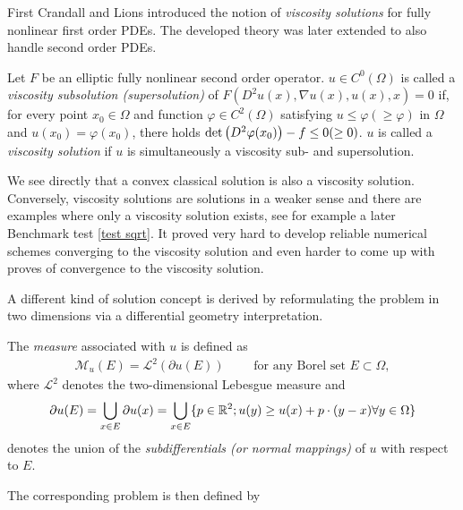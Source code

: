 First Crandall and Lions \cite{CL1983} introduced the notion of \emph{viscosity solutions} for fully nonlinear first order PDEs. The developed theory was later extended to also handle second order PDEs.
\begin{definition}
	Let $F$ be an elliptic  fully nonlinear second order operator.
	$u \in C^0(\Omega)$ is called a \emph{viscosity subsolution (supersolution)} of $F(D^2u(x), \nabla u(x), u(x), x)=0$  if, for every point $x_0 \in \Omega$ and function $\varphi \in C^2(\Omega)$ satisfying $u \leq \varphi (\geq \varphi)$ in $\Omega$ and $u(x_0) = \varphi(x_0)$, there holds $\det{\left(D^2 \varphi(x_0)\right)} - f \leq 0 (\geq 0)$. 
	$u$ is called a \emph{viscosity solution} if $u$ is simultaneously a viscosity sub- and supersolution.
\end{definition}

We see directly that a convex classical solution is also a viscosity solution. Conversely, viscosity solutions are solutions in a weaker sense and there are examples where only a viscosity solution exists, see for example a later Benchmark test \ref{test sqrt}.
It proved very hard to develop reliable numerical schemes converging to the viscosity solution and even harder to come up with proves of convergence to the viscosity solution.

A different kind of solution concept is derived by reformulating the \MA problem in two dimensions via a differential geometry interpretation.

\begin{definition}\label{def:MA measure}
	The \emph{\MA measure} associated with $u$ is defined as 
	\begin{align}
		\mathcal{M}_u (E) = \mathcal{L}^2(\partial u(E)) \qquad \text{ for any Borel set } E \subset \Omega,
	\end{align}
	where $\mathcal{L}^2$ denotes the two-dimensional Lebesgue measure and 
	\[
		\partial u(E) = \bigcup_{x \in E} \partial u (x) = \bigcup_{x \in E} \{p \in \mathbb{R}^2; u(y) \geq u(x) +p\cdot (y-x) \forall y \in \Omega\}
	\]
	denotes the union of the \emph{subdifferentials (or normal mappings)} of $u$ with respect to $E$.
\end{definition}
The corresponding \MA problem is then defined by

